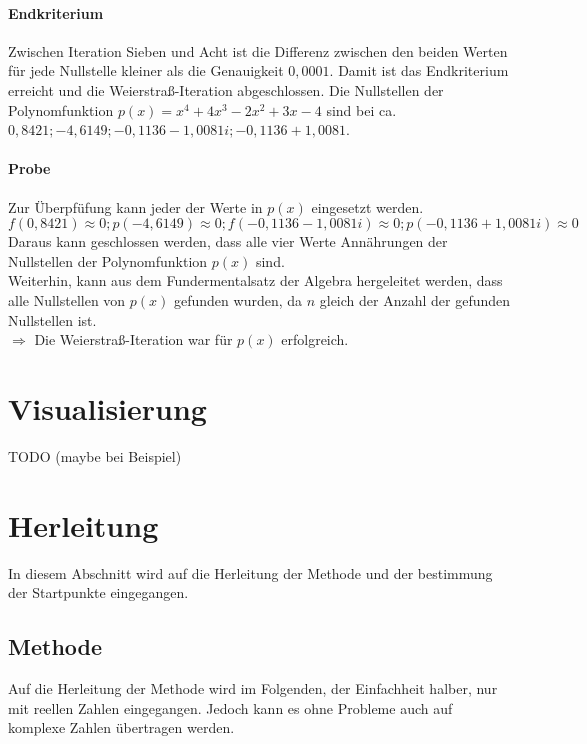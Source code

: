 \documentclass[12pt]{article}
\begin{document}
\paragraph{Endkriterium}
Zwischen Iteration Sieben und Acht ist die Differenz zwischen den beiden Werten für jede Nullstelle kleiner als die Genauigkeit $0,0001$. Damit ist das Endkriterium erreicht und die Weierstraß-Iteration abgeschlossen. 
Die Nullstellen der Polynomfunktion $p(x) = x^4 + 4x^3 - 2x^2 + 3x - 4$ sind bei ca. $0,8421; -4,6149; -0,1136 - 1,0081i; -0,1136 + 1,0081$. 
\paragraph{Probe}
Zur Überpfüfung kann jeder der Werte in $p(x)$ eingesetzt werden.
\begin{displaymath}
    f(0,8421) \approx 0; p(-4,6149) \approx 0; f(-0,1136 - 1,0081i) \approx 0; p(-0,1136 + 1,0081i) \approx 0
\end{displaymath}
Daraus kann geschlossen werden, dass alle vier Werte Annährungen der Nullstellen der Polynomfunktion $p(x)$ sind. \\
Weiterhin, kann aus dem Fundermentalsatz der Algebra hergeleitet werden, dass alle Nullstellen von $p(x)$ gefunden wurden, da $n$ gleich der Anzahl der gefunden Nullstellen ist. \\
$\Rightarrow$ Die Weierstraß-Iteration war für $p(x)$ erfolgreich.

\section{Visualisierung}
TODO (maybe bei Beispiel)


\section{Herleitung}
In diesem Abschnitt wird auf die Herleitung der Methode und der bestimmung der Startpunkte eingegangen.
\subsection{Methode}
Auf die Herleitung der Methode wird im Folgenden, der Einfachheit halber, nur mit reellen Zahlen eingegangen. Jedoch kann es ohne Probleme auch auf komplexe Zahlen übertragen werden.
\end{document}
